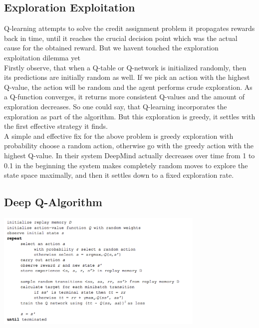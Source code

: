 \documentclass[twoside,letterpaper]{article}
\begin{document}
\subsection[Exploration Exploitation]{\rmfamily\bfseries\color{black}
Exploration Exploitation}
{\color{black}
Q-learning attempts to solve the credit assignment problem it propagates rewards back in time, until it reaches the crucial decision point which was the actual cause for the obtained reward. But we havent touched the exploration exploitation dilemma yet\\
\bigskip
Firstly observe, that when a Q-table or Q-network is initialized randomly, then its predictions are initially random as well. If we pick an action with the highest Q-value, the action will be random and the agent performs crude exploration. As a Q-function converges, it returns more consistent Q-values and the amount of exploration decreases. So one could say, that Q-learning incorporates the exploration as part of the algorithm. But this exploration is greedy, it settles with the first effective strategy it finds.\\
\bigskip
A simple and effective fix for the above problem is greedy exploration with probability choose a random action, otherwise go with the greedy action with the highest Q-value. In their system DeepMind actually decreases over time from 1 to 0.1 in the beginning the system makes completely random moves to explore the state space maximally, and then it settles down to a fixed exploration rate.\\
}

\subsection[Deep Q-Algorithm]{\rmfamily\bfseries\color{black}
Deep Q-Algorithm}

{\color{black}
\centering
\includegraphics[width=10cm]{images/deep3.png}\\}
\end{document}
